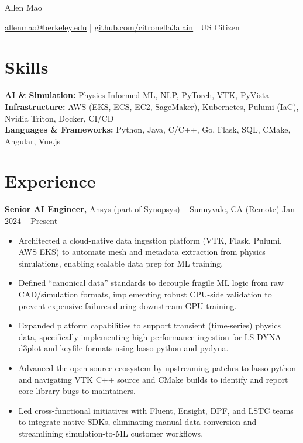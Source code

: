 \documentclass[11pt]{article}       %
\begin{document}
\centerline{\Huge Allen Mao}

\vspace{5pt}

\centerline{\href{mailto:allenmao@berkeley.edu}{allenmao@berkeley.edu} | \href{https://github.com/citronella3alain}{github.com/citronella3alain} | US Citizen}

\vspace{-10pt}

\section*{Skills}
\textbf{AI \& Simulation:} Physics-Informed ML, NLP, PyTorch, VTK, PyVista \\
\textbf{Infrastructure:} AWS (EKS, ECS, EC2, SageMaker), Kubernetes, Pulumi (IaC), Nvidia Triton, Docker, CI/CD \\
\textbf{Languages \& Frameworks:} Python, Java, C/C++, Go, Flask, SQL, CMake, Angular, Vue.js

\vspace{-6.5pt}

\section*{Experience}
\textbf{Senior AI Engineer,} {Ansys (part of Synopsys)} -- Sunnyvale, CA (Remote) \hfill Jan 2024 -- Present \\
\vspace{-9pt}
\begin{itemize}
  \item Architected a cloud-native data ingestion platform (VTK, Flask, Pulumi, AWS EKS) 
  to automate mesh and metadata extraction from physics simulations, enabling scalable data prep for ML training.
  \item Defined ``canonical data'' standards to decouple fragile ML logic from raw CAD/simulation formats, 
  implementing robust CPU-side validation to prevent expensive failures during downstream GPU training.
  \item Expanded platform capabilities to support transient (time-series) physics data, specifically implementing 
  high-performance ingestion for LS-DYNA d3plot and keyfile formats using \href{https://github.com/open-lasso-python/lasso-python}{lasso-python} 
  and \href{https://dyna.docs.pyansys.com/}{pydyna}.
  \item Advanced the open-source ecosystem by upstreaming patches to 
  \href{https://github.com/open-lasso-python/lasso-python}{lasso-python} and 
  navigating VTK C++ source and CMake builds to identify and report core library bugs to maintainers.
  \item Led cross-functional initiatives with Fluent, Ensight, DPF, and LSTC teams 
  to integrate native SDKs, eliminating manual data conversion and streamlining simulation-to-ML customer workflows.
\end{itemize}
\end{document}
